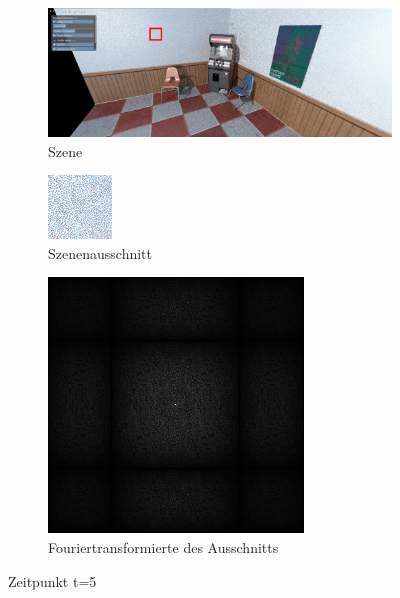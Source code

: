 \begin{figure}[H]
    \begin{subfigure}{\textwidth}   
        \centering \includegraphics[scale=.2]{content/TemporalerAlg/Bilder/Screenshotreihe/frame_t_5.0.png}
        \caption{Szene}
        \label{fig:Szene_t5}
    \end{subfigure}
    \begin{subfigure}{0.5\textwidth}
        \centering\includegraphics[width=0.5\linewidth]{content/TemporalerAlg/Bilder/Screenshotreihe/frame_t_5.0_64x64.png} 
        \caption{Szenenausschnitt}
        \label{fig:ausschnitt_t5}
    \end{subfigure}
    \begin{subfigure}{0.6\textwidth}
        \centering\includegraphics[width=0.5\linewidth]{content/TemporalerAlg/Bilder/Screenshotreihe/spektrum/frame_t_5.0_64x64_fourier.png}
        \caption{Fouriertransformierte des Ausschnitts}
        \label{fig:Fouriertransformierte_t5}
    \end{subfigure}
        \caption{Zeitpunkt t=5}
        \label{fig:Verlauf_t5}
\end{figure}

